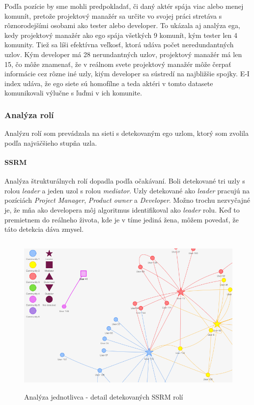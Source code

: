 \documentclass[slovak,master,public,dept460,male,cpdeclaration,oneside]{diploma}
\begin{document}
Podľa pozície by sme mohli predpokladať, či daný aktér spája viac alebo menej komunít, pretože projektový manažér sa určite vo svojej práci stretáva s rôznorodejšími osobami ako tester alebo developer. To ukázala aj analýza ega, kedy projektový manažér ako ego spája všetkých 9 komunít, kým tester len 4 komunity. Tiež sa líši efektívna veľkosť, ktorá udáva počet neredundantných uzlov. Kým developer má 28 nerundantných uzlov, projektový manažér má len 15, čo môže znamenať, že v reálnom svete projektový manažér môže čerpať informácie cez rôzne iné uzly, kiým developer sa sústredí na najbližšie spojky. E-I index udáva, že ego siete sú homofílne a teda aktéri v tomto datasete komunikovali výlučne s ľuďmi v ich komunite.

\subsubsection{Analýza rolí}
Analýzu rolí som prevádzala na sieti s detekovaným ego uzlom, ktorý som zvolila podľa najväčšieho stupňa uzla.

\paragraph{SSRM}
\hfill \break
Analýza štrukturálnych rolí dopadla podľa očakávaní. Boli detekované tri uzly s rolou \textit{leader} a jeden uzol s rolou \textit{mediator}. Uzly detekované ako \textit{leader} pracujú na pozíciách \textit{Project Manager}, \textit{Product owner} a \textit{Developer}. Možno trochu nezvyčajné je, že mňa ako developera môj algoritmus identifikoval ako  \textit{leader} rolu. Keď  to premietnem do reálneho života, kde je v tíme jediná žena, môžem povedať, že táto detekcia dáva zmysel.


\begin{figure}[H]
\centering
\includegraphics[width=12cm, height=8cm]{figures/analyza_jednotlivca_ssrm_detail}
\caption{Analýza jednotlivca - detail detekovaných SSRM rolí}
\end{figure}
\end{document}
